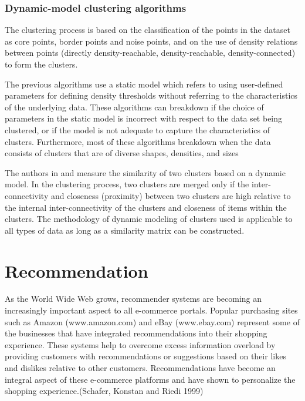\subsubsection{Dynamic-model clustering algorithms}
The clustering process is based on the classification of the points in the dataset as  core 
points,  border points and  noise points, and on the use of density relations between points 
(directly density-reachable,  density-reachable,  density-connected) to form the 
clusters. 

The previous algorithms use a static model which refers to using user-defined parameters for defining density thresholds without referring to the characteristics of the underlying data. These algorithms can breakdown if the choice of parameters in the static model is incorrect with respect to the data set being clustered, or if the model is not adequate to capture the characteristics of clusters. Furthermore, most of these
algorithms breakdown when the data consists of clusters that are of diverse shapes, densities, and sizes

The authors in \citep{clustering_14} and \cite{Mitosis_1} measure the similarity of two clusters based on
a dynamic model. In the clustering process, two clusters are merged only if the inter-connectivity and closeness
(proximity) between two clusters are high relative to the internal inter-connectivity of the clusters and closeness of
items within the clusters. The methodology of dynamic modeling of clusters used is applicable to all types of data as long as a similarity matrix can be constructed.

\section{Recommendation}
As the World Wide Web grows, recommender systems are becoming an increasingly important aspect to all e-commerce portals. Popular purchasing sites such as Amazon (www.amazon.com) and eBay (www.ebay.com) represent some of the businesses that have integrated recommendations into their shopping experience. These systems help to overcome excess information overload by providing customers with recommendations or suggestions based on their likes and dislikes relative to other customers.
Recommendations have become an integral aspect of these e-commerce platforms and have shown to personalize the shopping experience.(Schafer, Konstan and Riedi 1999) 
